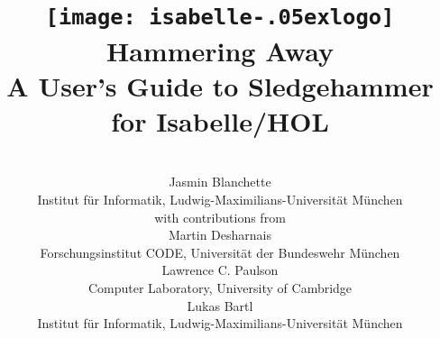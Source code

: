 \documentclass[a4paper,12pt]{article}
\renewcommand\_{\hbox{\textunderscore\kern-.05ex}}
\begin{document}
\renewcommand\labelitemi{\raise.065ex\hbox{\small\textbullet}}

\title{\texttt{[image: isabelle\_logo]} \\[4ex]
Hammering Away \\[\smallskipamount]
\Large A User's Guide to Sledgehammer for Isabelle/HOL}
\author{\hbox{} \\
Jasmin Blanchette \\
{\normalsize Institut f\"ur Informatik, Ludwig-Maximilians-Universit\"at M\"unchen} \\[4\smallskipamount]
{\normalsize with contributions from} \\[4\smallskipamount]
Martin Desharnais \\
{\normalsize Forschungsinstitut CODE, Universit\"at der Bundeswehr M\"unchen}  \\[4\smallskipamount]
Lawrence C. Paulson \\
{\normalsize Computer Laboratory, University of Cambridge} \\[4\smallskipamount]
Lukas Bartl \\
{\normalsize Institut f\"ur Informatik, Ludwig-Maximilians-Universit\"at M\"unchen} \\
\hbox{}}

\maketitle

\newpage
\tableofcontents

\setlength{\parskip}{.7em plus .2em minus .1em}
\setlength{\parindent}{0pt}
\setlength{\abovedisplayskip}{\parskip}
\setlength{\abovedisplayshortskip}{.9\parskip}
\setlength{\belowdisplayskip}{\parskip}
\setlength{\belowdisplayshortskip}{.9\parskip}

\newenvironment{enum}%
    {\begin{list}{}{%
        \setlength{\topsep}{.1\parskip}%
        \setlength{\partopsep}{.1\parskip}%
        \setlength{\itemsep}{\parskip}%
        \advance\itemsep by-\parsep}}
    {\end{list}}

\def\pre{\begingroup\vskip0pt plus1ex\advance\leftskip by\leftmargin
\advance\rightskip by\leftmargin}
\def\post{\vskip0pt plus1ex\endgroup}

\def\prew{\pre\advance\rightskip by-\leftmargin}
\def\postw{\post}
\end{document}
